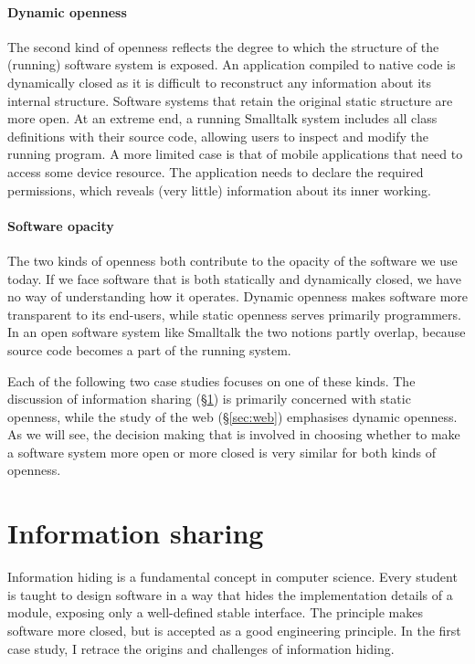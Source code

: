 \paragraph{Dynamic openness}
The second kind of openness reflects the degree to which the structure of the (running)
software system is exposed. An application compiled to native code is dynamically closed
as it is difficult to reconstruct any information about its internal
structure.
Software systems that retain the original static structure are more open.
At an extreme end, a running Smalltalk system includes all class definitions with their source code,
allowing users to inspect and modify the running program. A more limited case is that of mobile
applications that need to access some device resource. The application needs to declare the
required permissions, which reveals (very little) information about its inner working.

\paragraph{Software opacity}
The two kinds of openness both contribute to the opacity of the
software we use today. If we face software that is both statically and dynamically
closed, we have no way of understanding how it operates. Dynamic openness makes software more
transparent to its end-users, while static openness serves primarily programmers.
In an open software system like Smalltalk the two notions partly overlap, because source code
becomes a part of the running system.

Each of the following two case studies focuses on one of these kinds. The discussion of
information sharing (\S\ref{sec:info}) is primarily concerned with static openness, while the
study of the web (\S\ref{sec:web}) emphasises dynamic openness.
As we will see, the decision making that is involved in choosing whether to make a
software system more open or more closed is very similar for both kinds of openness.

\section{Information sharing}
\label{sec:info}

Information hiding is a fundamental concept in computer science. Every student is taught to
design software in a way that hides the implementation details of a module, exposing only a
well-defined stable interface. The principle makes software more closed, but is accepted as a
good engineering principle. In the first case study, I retrace the origins and challenges of
information hiding.

